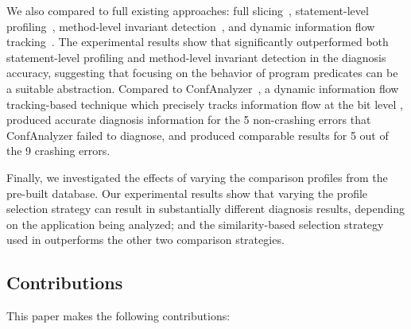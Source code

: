 We also compared \ourtool to
full existing approaches: full slicing~\cite{},
statement-level profiling~\cite{Jones:2002}, method-level
invariant detection~\cite{Ernst:1999}, and dynamic information flow
tracking~\cite{Rabkin:2011:PPC}. The experimental results show that
\ourtool significantly outperformed both statement-level profiling
and method-level invariant detection in the diagnosis accuracy, suggesting
that focusing on the behavior of program predicates can be a
suitable abstraction. Compared to ConfAnalyzer~\cite{}, a dynamic
information flow tracking-based technique
which precisely tracks information flow at the bit level , \ourtool
produced accurate diagnosis information for the 5 non-crashing errors that
ConfAnalyzer failed to diagnose, and produced comparable results
for 5 out of the 9 crashing errors. 

Finally, we investigated the effects of varying the comparison profiles
from the pre-built database.
Our experimental results show that varying the
profile selection strategy can result in substantially different
diagnosis results, depending on the application being analyzed;
and the similarity-based selection strategy used in \ourtool outperforms
the other two comparison strategies.







\subsection{Contributions}
This paper makes the following contributions:

